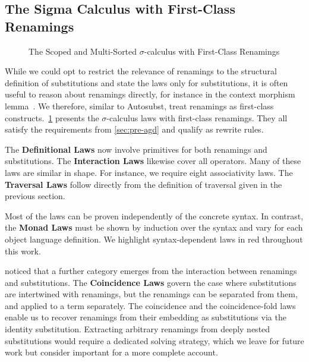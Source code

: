 \documentclass[screen,nonacm]{acmart}
\begin{document}
\subsection{The Sigma Calculus with First-Class Renamings}\label{sec:mis-sig}
\begin{figure}[t]
      \centering

      \begin{minipage}[t]{0.38\linewidth}
            \raggedright{}
            \EDefLaws{}
            \ERewriteSys{}
      \end{minipage}
      \hfill
      \begin{minipage}[t]{0.58\linewidth}
            \raggedright{}
            \EInteractLaws{}
            \EMonadLaws{}
      \end{minipage}
      \caption{The Scoped and Multi-Sorted $σ$-calculus with First-Class Renamings}\label{fig:mis-sig}
\end{figure}

While we could opt to restrict the relevance of renamings to the structural
definition of substitutions and state the laws only for substitutions, it is
often useful to reason about renamings directly, for instance in the context
morphism lemma~\cite{goguen1997candidates}. We therefore, similar to Autosubst,
treat renamings as first-class constructs.\ \cref{fig:mis-sig} presents the
$σ$-calculus laws with first-class renamings. They all satisfy the requirements
from \cref{sec:pre-agd} and qualify as rewrite rules.

The \textbf{Definitional Laws} now involve primitives for both renamings and
substitutions. The \textbf{Interaction Laws} likewise cover all operators. Many
of these laws are similar in shape. For instance, we require eight
associativity laws. The \textbf{Traversal Laws} follow directly from the
definition of traversal given in the previous section.

Most of the laws can be proven independently of the concrete syntax. In
contrast, the \textbf{Monad Laws} must be shown by induction over the syntax
and vary for each object language definition. We highlight syntax-dependent
laws in red throughout this work.

\citet{10.1145/3293880.3294101} noticed that a further category emerges from the interaction between
renamings and substitutions. The \textbf{Coincidence Laws} govern the case where
substitutions are intertwined with renamings, but the renamings can be
separated from them, and applied to a term separately.
The coincidence and the coincidence-fold laws
enable us to recover renamings from their embedding as substitutions via the
identity substitution. Extracting arbitrary renamings from deeply nested substitutions would require a
dedicated solving strategy, which we leave for future work but consider
important for a more complete account.
\end{document}
